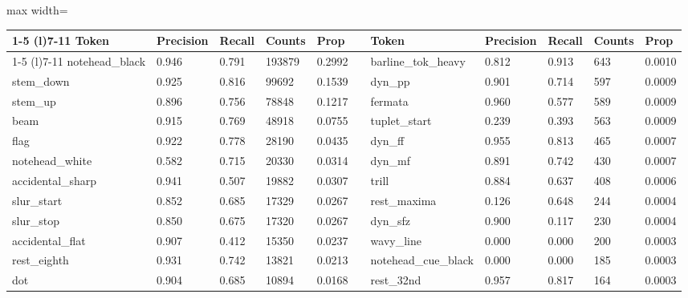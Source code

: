 \begin{table*}[ht]
\caption{Results for Tier 1 computation on the Dataset's test partition.}
\label{tab:tier1}
\begin{adjustbox}{max width=\textwidth}
\begin{tabular}{@{}lllllllllll@{}}
\cmidrule(r){1-5} \cmidrule(l){7-11}
Token                  & Precision & Recall & Counts & Prop   &  & Token                     & Precision & Recall & Counts & Prop   \\ \cmidrule(r){1-5} \cmidrule(l){7-11} 
notehead\_black        & 0.946     & 0.791  & 193879 & 0.2992 &  & barline\_tok\_heavy       & 0.812     & 0.913  & 643    & 0.0010 \\
stem\_down             & 0.925     & 0.816  & 99692  & 0.1539 &  & dyn\_pp                   & 0.901     & 0.714  & 597    & 0.0009 \\
stem\_up               & 0.896     & 0.756  & 78848  & 0.1217 &  & fermata                   & 0.960     & 0.577  & 589    & 0.0009 \\
beam                   & 0.915     & 0.769  & 48918  & 0.0755 &  & tuplet\_start             & 0.239     & 0.393  & 563    & 0.0009 \\
flag                   & 0.922     & 0.778  & 28190  & 0.0435 &  & dyn\_ff                   & 0.955     & 0.813  & 465    & 0.0007 \\
notehead\_white        & 0.582     & 0.715  & 20330  & 0.0314 &  & dyn\_mf                   & 0.891     & 0.742  & 430    & 0.0007 \\
accidental\_sharp      & 0.941     & 0.507  & 19882  & 0.0307 &  & trill                     & 0.884     & 0.637  & 408    & 0.0006 \\
slur\_start            & 0.852     & 0.685  & 17329  & 0.0267 &  & rest\_maxima              & 0.126     & 0.648  & 244    & 0.0004 \\
slur\_stop             & 0.850     & 0.675  & 17320  & 0.0267 &  & dyn\_sfz                  & 0.900     & 0.117  & 230    & 0.0004 \\
accidental\_flat       & 0.907     & 0.412  & 15350  & 0.0237 &  & wavy\_line                & 0.000     & 0.000  & 200    & 0.0003 \\
rest\_eighth           & 0.931     & 0.742  & 13821  & 0.0213 &  & notehead\_cue\_black      & 0.000     & 0.000  & 185    & 0.0003 \\
dot                    & 0.904     & 0.685  & 10894  & 0.0168 &  & rest\_32nd                & 0.957     & 0.817  & 164    & 0.0003 \\

\end{tabular}
\end{adjustbox}
\end{table*}

